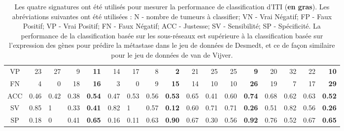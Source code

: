 \begin{sidewaystable}
\begin{center}
\begin{tabular}{crrrrrrrrrrrrrrrr}
						VP        & 23    & 27    & 9     & \textbf{11}                               & 14    & 17    & 8     & \textbf{2}                    & 21    & 25    & 25    & \textbf{9}                                & 20    & 32    & 22    & \textbf{10}                    \\
						FN        & 4     & 0     & 18    & \textbf{16}                               & 3     & 0     & 9     & \textbf{15}                   & 14    & 10    & 10    & \textbf{26}                               & 19    & 7     & 17    & \textbf{29}                    \\
						\midrule
						ACC       & 0.46  & 0.42  & 0.38  & \textbf{0.54}                             & 0.47  & 0.53  & 0.56  & \textbf{0.53}                 & 0.65  & 0.41  & 0.60  & \textbf{0.74}                             & 0.68  & 0.62  & 0.63  & \textbf{0.52}                  \\
						SV        & 0.85  & \multicolumn{1}{l}{1} & 0.33  & \textbf{0.41}             & 0.82  & \multicolumn{1}{l}{1} & 0.57  & \textbf{0.12} & 0.60  & 0.71  & 0.71  & \textbf{0.26}                             & 0.51  & 0.82  & 0.56  & \textbf{0.26}                  \\
						SP        & 0.18  & \multicolumn{1}{l}{0} & 0.41  & \textbf{0.65}             & 0.16  & 0.11                  & 0.63  & \textbf{0.90} & 0.67  & 0.30  & 0.56  & \textbf{0.92}                             & 0.76  & 0.52  & 0.67  & \textbf{0.65}                  \\
						\bottomrule
					\end{tabular}
					\label{tab:Res2Classif}
					\vspace{5ex}
					\caption*{Les quatre signatures ont été utilisés pour mesurer la performance de classification d'ITI (\textbf{en gras}). Les abréviations suivantes ont été utilisées : N - nombre de tumeurs à classifier; VN - Vrai Négatif; FP - Faux Positif; VP - Vrai Positif; FN - Faux Négatif; ACC - Justesse; SV - Sensibilité; SP - Spécificité. La performance de la classification basée sur les sous-réseaux est supérieure à la classification basée sur l'expression des gènes pour prédire la métastase dans le jeu de données de Desmedt, et ce de façon similaire pour le jeu de données de van de Vijver.}
				\end{center}
			\end{sidewaystable}

